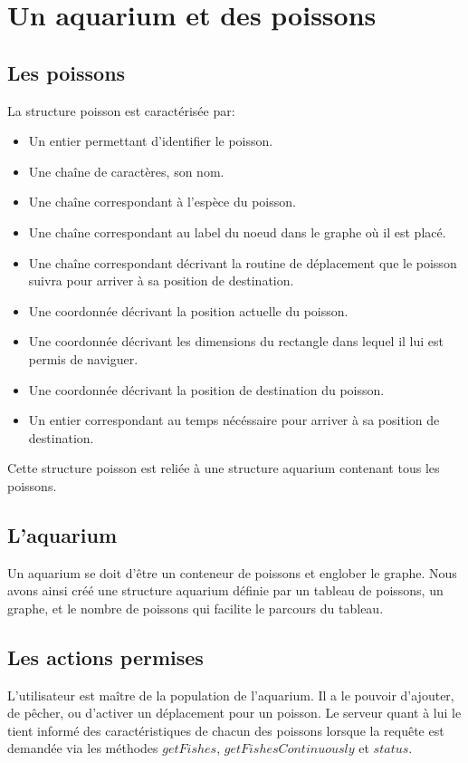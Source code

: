 \section{Un aquarium et des poissons}

\subsection{Les poissons}

\indent La structure poisson est caractérisée par: \\
\begin{itemize}
\item Un entier permettant d'identifier le poisson.
\item Une chaîne de caractères, son nom.
\item Une chaîne correspondant à l'espèce du poisson.
\item Une chaîne correspondant au label du noeud dans le graphe où il est placé.
\item Une chaîne correspondant décrivant la routine de déplacement que le poisson suivra pour arriver à sa position de destination.
\item Une coordonnée décrivant la position actuelle du poisson.
\item Une coordonnée décrivant les dimensions du rectangle dans lequel il lui est permis de naviguer.
\item Une coordonnée décrivant la position de destination du poisson.
\item Un entier correspondant au temps nécéssaire pour arriver à sa position de destination.
\end{itemize}
Cette structure poisson est reliée à une structure aquarium contenant tous les poissons.

\subsection{L'aquarium}
\indent Un aquarium se doit d'être un conteneur de poissons et englober le graphe. Nous avons ainsi créé une structure aquarium définie par un tableau de poissons, un graphe, et le nombre de poissons qui facilite le parcours du tableau.


\subsection{Les actions permises}

\indent L'utilisateur est maître de la population de l'aquarium. Il a le pouvoir d'ajouter, de pêcher, ou d'activer un déplacement pour un poisson. Le serveur quant à lui le tient informé des caractéristiques de chacun des poissons lorsque la requête est demandée via les méthodes $getFishes$, $getFishesContinuously$ et $status$.

